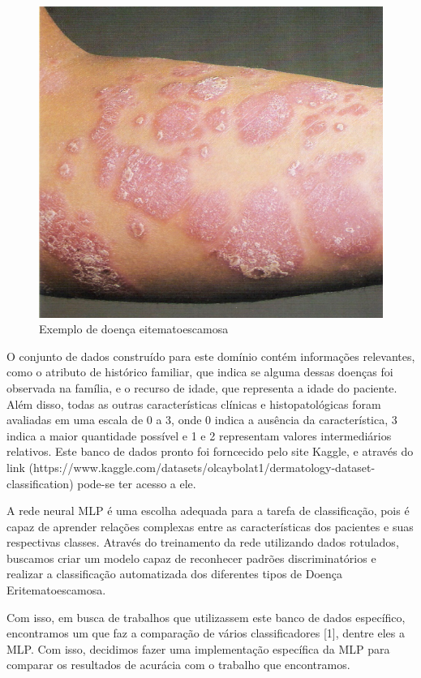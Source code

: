 \documentclass[conference]{IEEEtran}
\begin{document}
\begin{figure}[htbp]
    \centerline{\includegraphics{./figuras/figura1.jpg}}
    \caption{Exemplo de doença eitematoescamosa}
    \label{fig:doenca}
\end{figure}

O conjunto de dados construído para este domínio contém informações relevantes, como o atributo de histórico familiar, que indica se alguma dessas doenças foi observada na família, e o recurso de idade, que representa a idade do paciente. Além disso, todas as outras características clínicas e histopatológicas foram avaliadas em uma escala de 0 a 3, onde 0 indica a ausência da característica, 3 indica a maior quantidade possível e 1 e 2 representam valores intermediários relativos. Este banco de dados pronto foi forncecido pelo site Kaggle, e através do link (https://www.kaggle.com/datasets/olcaybolat1/dermatology-dataset-classification) pode-se ter acesso a ele.

A rede neural MLP é uma escolha adequada para a tarefa de classificação, pois é capaz de aprender relações complexas entre as características dos pacientes e suas respectivas classes. Através do treinamento da rede utilizando dados rotulados, buscamos criar um modelo capaz de reconhecer padrões discriminatórios e realizar a classificação automatizada dos diferentes tipos de Doença Eritematoescamosa.

Com isso, em busca de trabalhos que utilizassem este banco de dados específico, encontramos um que faz a comparação de vários classificadores [1], dentre eles a MLP. Com isso, decidimos fazer uma implementação específica da MLP para comparar os resultados de acurácia com o trabalho que encontramos. 
\end{document}
